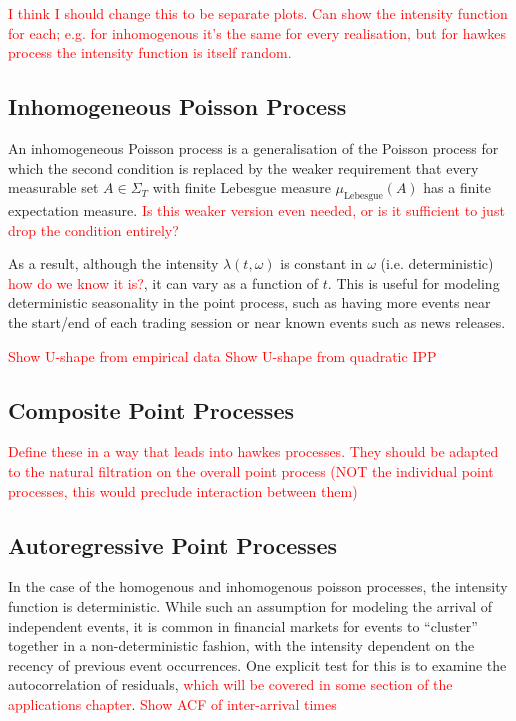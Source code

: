 \documentclass[honours,12pt]{unswthesis}
\numberwithin{equation}{section}
\begin{document}
\textcolor{red}{I think I should change this to be separate plots. Can show the intensity function for each; e.g. for inhomogenous it's the same for every realisation, but for hawkes process the intensity function is itself random.}

\subsection{Inhomogeneous Poisson Process}
An inhomogeneous Poisson process is a generalisation of the Poisson process for which the second condition is replaced by the weaker requirement that every measurable set $A\in\Sigma_T$ with finite Lebesgue measure $\mu_{\mathrm{Lebesgue}}(A)$ has a finite expectation measure. \textcolor{red}{Is this weaker version even needed, or is it sufficient to just drop the condition entirely?}

As a result, although the intensity $\lambda(t,\omega)$ is constant in $\omega$ (i.e. deterministic) \textcolor{red}{how do we know it is?}, it can vary as a function of $t$. This is useful for modeling deterministic seasonality in the point process, such as having more events near the start/end of each trading session or near known events such as news releases.

\textcolor{red}{Show U-shape from empirical data}
\textcolor{red}{Show U-shape from quadratic IPP}

\subsection{Composite Point Processes}
\textcolor{red}{Define these in a way that leads into hawkes processes. They should be adapted to the natural filtration on the overall point process (NOT the individual point processes, this would preclude interaction between them)}

\subsection{Autoregressive Point Processes}
In the case of the homogenous and inhomogenous poisson processes, the intensity function is deterministic. While such an assumption for modeling the arrival of independent events, it is common in financial markets for events to ``cluster'' together in a non-deterministic fashion, with the intensity dependent on the recency of previous event occurrences. One explicit test for this is to examine the autocorrelation of residuals, \textcolor{red}{which will be covered in some section of the applications chapter}.
\textcolor{red}{Show ACF of inter-arrival times}
\end{document}
